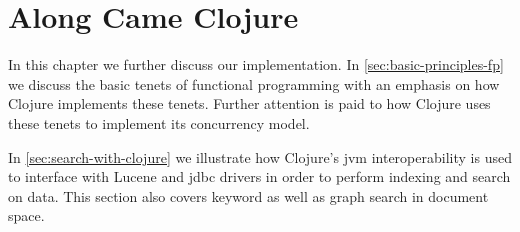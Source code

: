 \chapter{Along Came Clojure}
\label{chap:along-came-clojure}
	In this chapter we further discuss our implementation.  In \cref{sec:basic-principles-fp} we discuss the basic tenets of functional programming with an emphasis on how Clojure implements these tenets.  Further attention is paid to how Clojure uses these tenets to implement its concurrency model.
	
	In \cref{sec:search-with-clojure} we illustrate how Clojure's \gls{jvm} interoperability is used to interface with Lucene and \gls{jdbc} drivers in order to perform indexing and search on data.  This section also covers keyword as well as graph search in document space.
	
	
	